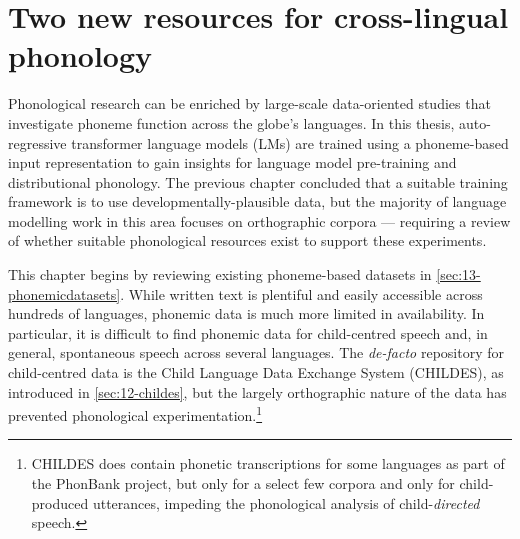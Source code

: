 \chapter{Two new resources for cross-lingual phonology}\label{chapter:resources}


Phonological research can be enriched by large-scale data-oriented studies that investigate phoneme function across the globe's languages. In this thesis, auto-regressive transformer language models (LMs) are trained using a phoneme-based input representation to gain insights for language model pre-training and distributional phonology. The previous chapter concluded that a suitable training framework is to use developmentally-plausible data, but the majority of language modelling work in this area focuses on orthographic corpora --- requiring a review of whether suitable phonological resources exist to support these experiments.


This chapter begins by reviewing existing phoneme-based datasets in \cref{sec:13-phonemicdatasets}. While written text is plentiful and easily accessible across hundreds of languages, phonemic data is much more limited in availability. In particular, it is difficult to find phonemic data for child-centred speech and, in general, spontaneous speech across several languages. The \emph{de-facto} repository for child-centred data is the Child Language Data Exchange System (CHILDES), as introduced in \cref{sec:12-childes}, but the largely orthographic nature of the data has prevented phonological experimentation.\footnote{CHILDES does contain phonetic transcriptions for some languages as part of the PhonBank project, but only for a select few corpora and only for child-produced utterances, impeding the phonological analysis of child-\emph{directed} speech.} 

